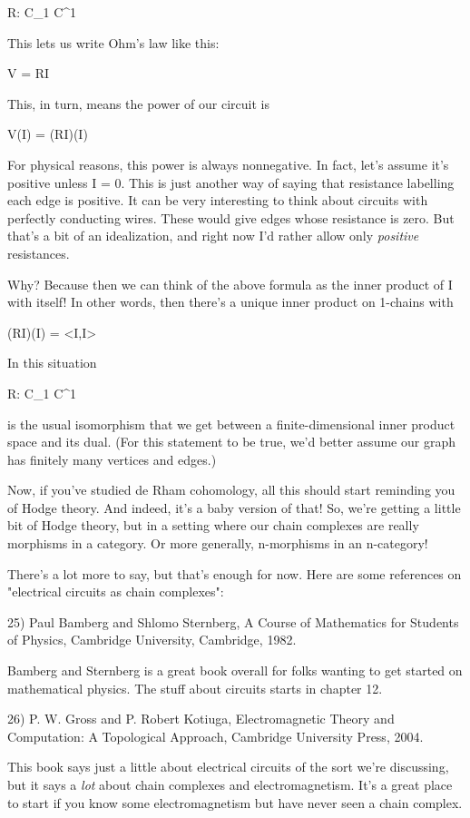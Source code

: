 R: C_{1} \to  C^{1}

This lets us write Ohm's law like this:

V = RI

This, in turn, means the power of our circuit is

V(I) = (RI)(I)

For physical reasons, this power is always nonnegative.  In fact,
let's assume it's positive unless I = 0.  This is just another way of
saying that resistance labelling each edge is positive.  It can be
very interesting to think about circuits with perfectly conducting
wires.  These would give edges whose resistance is zero.  But that's a
bit of an idealization, and right now I'd rather allow only \emph{positive}
resistances.

Why?  Because then we can think of the above formula as the inner
product of I with itself!  In other words, then there's a unique inner
product on 1-chains with

(RI)(I) = <I,I>

In this situation

R: C_{1} \to  C^{1}

is the usual isomorphism that we get between a finite-dimensional
inner product space and its dual.  (For this statement to be true,
we'd better assume our graph has finitely many vertices and edges.)

Now, if you've studied de Rham cohomology, all this should start
reminding you of Hodge theory.  And indeed, it's a baby version
of that!  So, we're getting a little bit of Hodge theory, but in
a setting where our chain complexes are really morphisms in a category.
Or more generally, n-morphisms in an n-category!

There's a lot more to say, but that's enough for now.
Here are some references on "electrical circuits as chain
complexes":

25) Paul Bamberg and Shlomo Sternberg, A Course of Mathematics for
Students of Physics, Cambridge University, Cambridge, 1982.

Bamberg and Sternberg is a great book overall for folks wanting to 
get started on mathematical physics.  The stuff about circuits
starts in chapter 12.  

26) P. W. Gross and P. Robert Kotiuga, Electromagnetic Theory and
Computation: A Topological Approach, Cambridge University Press, 2004.

This book says just a little about electrical circuits of the sort
we're discussing, but it says a \emph{lot} about chain complexes
and electromagnetism.  It's a great place to start if you know some
electromagnetism but have never seen a chain complex.


